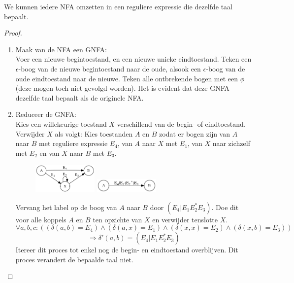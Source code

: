 \documentclass[main.tex]{subfiles}
\begin{document}
\begin{st}
  \label{st:nfa-naar-regex}
  We kunnen iedere NFA omzetten in een reguliere expressie die dezelfde taal bepaalt.
  
  \begin{proof}
    \begin{enumerate}
    \item Maak van de NFA een GNFA:\\
      Voer een nieuwe begintoestand, en een nieuwe unieke eindtoestand.
      Teken een $\epsilon$-boog van de nieuwe begintoestand naar de oude, alsook een $\epsilon$-boog van de oude eindtoestand naar de nieuwe.
      Teken alle ontbrekende bogen met een $\phi$ (deze mogen toch niet gevolgd worden).
      Het is evident dat deze GNFA dezelfde taal bepaalt als de originele NFA.
    \item Reduceer de GNFA:\\
      Kies een willekeurige toestand $X$ verschillend van de begin- of eindtoestand.
      Verwijder $X$ als volgt: Kies toestanden $A$ en $B$ zodat er bogen zijn van $A$ naar $B$ met reguliere expressie $E_{4}$, van $A$ naar $X$ met $E_{1}$, van $X$ naar zichzelf met $E_{2}$ en van $X$ naar $B$ met $E_{3}$.
      \begin{figure}[H]
        \centering
        \includegraphics[width=0.3\textwidth]{assets/nfa-gnfa1.png}
        \includegraphics[width=0.3\textwidth]{assets/nfa-gnfa2.png}   
        \label{fig:nfa-gnfa}
      \end{figure}
      Vervang het label op de boog van $A$ naar $B$ door $(E_{4}|E_{1}E_{2}^{*}E_{3})$.
      Doe dit voor alle koppels $A$ en $B$ ten opzichte van $X$ en verwijder tenslotte $X$.
      \[
      \forall a,b,c: ((\delta(a,b)=E_{4})\wedge (\delta(a,x)=E_{1})\wedge (\delta(x,x)=E_{2})\wedge (\delta(x,b)=E_{3})) 
      \]
      \[
      \Rightarrow \delta'(a,b)=(E_{4}|E_{1}E_{2}^{*}E_{3})
      \]
      Itereer dit proces tot enkel nog de begin- en eindtoestand overblijven.
      Dit proces verandert de bepaalde taal niet.

\end{enumerate}
\end{proof}
\end{st}
\end{document}
